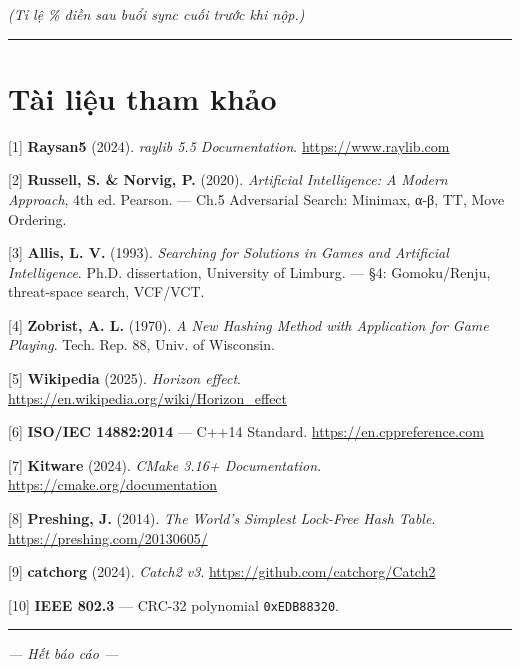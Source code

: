 \documentclass[11pt,a4paper]{article}
\begin{document}
\emph{(Tỉ lệ \% điền sau buổi sync cuối trước khi nộp.)}

\noindent\rule{\textwidth}{0.5pt}
\section{Tài liệu tham khảo}
\label{sec:orgf2bfa83}

{[}1] \textbf{Raysan5} (2024). \emph{raylib 5.5 Documentation}. \url{https://www.raylib.com}

{[}2] \textbf{Russell, S. \& Norvig, P.} (2020). \emph{Artificial Intelligence: A Modern Approach}, 4th ed. Pearson. — Ch.5 Adversarial Search: Minimax, α-β, TT, Move Ordering.

{[}3] \textbf{Allis, L. V.} (1993). \emph{Searching for Solutions in Games and Artificial Intelligence}. Ph.D. dissertation, University of Limburg. — §4: Gomoku/Renju, threat-space search, VCF/VCT.

{[}4] \textbf{Zobrist, A. L.} (1970). \emph{A New Hashing Method with Application for Game Playing}. Tech. Rep. 88, Univ. of Wisconsin.

{[}5] \textbf{Wikipedia} (2025). \emph{Horizon effect}. \url{https://en.wikipedia.org/wiki/Horizon\_effect}

{[}6] \textbf{ISO/IEC 14882:2014} — C++14 Standard. \url{https://en.cppreference.com}

{[}7] \textbf{Kitware} (2024). \emph{CMake 3.16+ Documentation}. \url{https://cmake.org/documentation}

{[}8] \textbf{Preshing, J.} (2014). \emph{The World's Simplest Lock-Free Hash Table}. \url{https://preshing.com/20130605/}

{[}9] \textbf{catchorg} (2024). \emph{Catch2 v3}. \url{https://github.com/catchorg/Catch2}

{[}10] \textbf{IEEE 802.3} — CRC-32 polynomial \texttt{0xEDB88320}.

\noindent\rule{\textwidth}{0.5pt}

\emph{— Hết báo cáo —}
\end{document}
